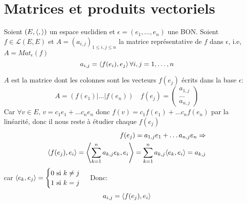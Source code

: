 \section{Matrices et produits vectoriels}
\begin{prop} Soient $(E, \langle , \rangle)$ un espace euclidien et $\epsilon = (e_1, \ldots, e_n)$ une BON. Soient $f \in \mathcal{L}(E, E)$ et $A = (a_{i,j})_{1 \le i,j \le n}$ la matrice représentative de $f$ dans  $\epsilon$, i.e,  $A = Mat_{\epsilon}(f)$ 
    \[
        a_{i,j} = \langle f(e_i), e_j \rangle \, \forall i,j = 1, \ldots, n
    \] 
\end{prop}
\begin{preuve}
   $A$ est la matrice dont les colonnes sont les vecteurs  $f(e_j)$ écrits dans la base $\epsilon$:
    \[
        A = (f(e_1) | \ldots | f(e_n))\quad f(e_j) = \begin{pmatrix} a_{1,j}\\ \ldots\\ a_{n, j} \end{pmatrix} 
   \] 
   Car $\forall v \in E, \, v = c_1e_1 + \ldots c_ne_n$ donc $f(v) = c_1f(e_1) + \ldots c_nf(e_n)$ par la linéarité, donc il nous reste à étudier chaque $f(e_j)$
   \begin{align*}
       f(e_j) = a_{1, j}e_1 + \ldots a_{n, j}e_n \Rightarrow\\
       \langle f(e_j), e_i \rangle = \left\langle \sum_{k=1}^n a_{k,j} e_k, e_i \right\rangle = \sum_{k=1}^{n} a_{k,j}\langle e_k, e_i \rangle = a_{k, j}
   \end{align*}
   car $\langle e_k, e_j \rangle = \begin{cases}
       0 \text{ si } k \neq j\\
       1 \text{ si } k = j
   \end{cases}$
   Donc:
   \[
       a_{i, j} = \langle f(e_j), e_i \rangle
   \] 
\end{preuve}


